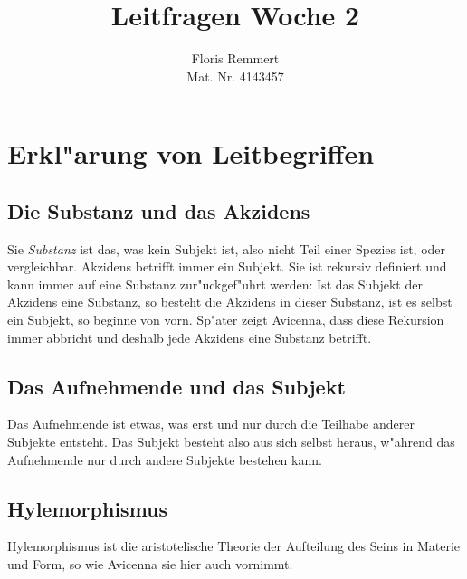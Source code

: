\documentclass[a4paper,12pt]{article}
\title{Leitfragen Woche 2}
\author{Floris Remmert\\\small{Mat. Nr. 4143457}}
\begin{document}
\maketitle

%

\section{Erkl"arung von Leitbegriffen}
	\subsection{Die Substanz und das Akzidens}
		Sie \emph{Substanz} ist das, was kein Subjekt ist, also nicht Teil einer Spezies ist, oder vergleichbar. Akzidens betrifft immer ein Subjekt. Sie ist rekursiv definiert und kann immer auf eine Substanz zur"uckgef"uhrt werden: Ist das Subjekt der Akzidens eine Substanz, so besteht die Akzidens in dieser Substanz, ist es selbst ein Subjekt, so beginne von vorn. Sp"ater zeigt Avicenna, dass diese Rekursion immer abbricht und deshalb jede Akzidens eine Substanz betrifft.
	\subsection{Das Aufnehmende und das Subjekt}
		Das Aufnehmende ist etwas, was erst und nur durch die Teilhabe anderer Subjekte entsteht. Das Subjekt besteht also aus sich selbst heraus, w"ahrend das Aufnehmende nur durch andere Subjekte bestehen kann.
	\subsection{Hylemorphismus}
		Hylemorphismus ist die aristotelische Theorie der Aufteilung des Seins in Materie und Form, so wie Avicenna sie hier auch vornimmt.
\end{document}
